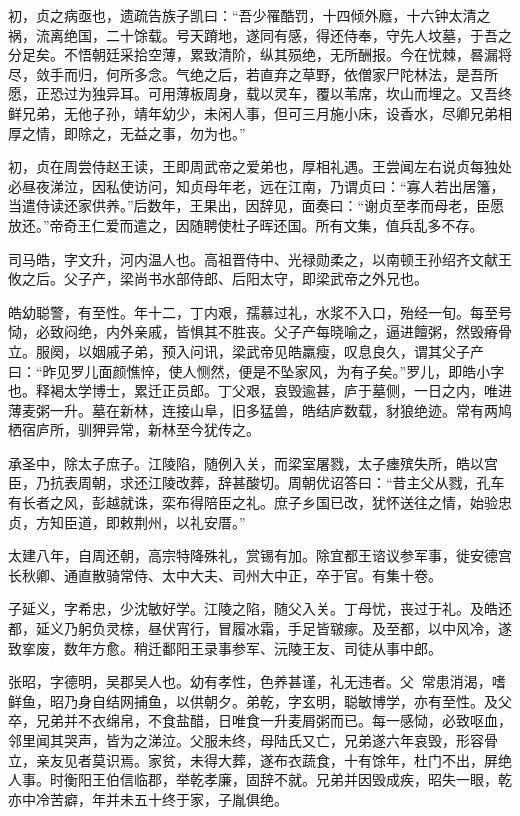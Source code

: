 \documentclass[]{article}
\begin{document}
初，贞之病亟也，遗疏告族子凯曰：``吾少罹酷罚，十四倾外廕，十六钟太清之祸，流离绝国，二十馀载。号天蹐地，遂同有感，得还侍奉，守先人坟墓，于吾之分足矣。不悟朝廷采拾空薄，累致清阶，纵其殒绝，无所酬报。今在忧棘，晷漏将尽，敛手而归，何所多念。气绝之后，若直弃之草野，依僧家尸陀林法，是吾所愿，正恐过为独异耳。可用薄板周身，载以灵车，覆以苇席，坎山而埋之。又吾终鲜兄弟，无他子孙，靖年幼少，未闲人事，但可三月施小床，设香水，尽卿兄弟相厚之情，即除之，无益之事，勿为也。''

初，贞在周尝侍赵王读，王即周武帝之爱弟也，厚相礼遇。王尝闻左右说贞每独处必昼夜涕泣，因私使访问，知贞母年老，远在江南，乃谓贞曰：``寡人若出居籓，当遣侍读还家供养。''后数年，王果出，因辞见，面奏曰：``谢贞至孝而母老，臣愿放还。''帝奇王仁爱而遣之，因随聘使杜子晖还国。所有文集，值兵乱多不存。

司马皓，字文升，河内温人也。高祖晋侍中、光禄勋柔之，以南顿王孙绍齐文献王攸之后。父子产，梁尚书水部侍郎、后阳太守，即梁武帝之外兄也。

皓幼聪警，有至性。年十二，丁内艰，孺慕过礼，水浆不入口，殆经一旬。每至号恸，必致闷绝，内外亲戚，皆惧其不胜丧。父子产每晓喻之，逼进饘粥，然毁瘠骨立。服阕，以姻戚子弟，预入问讯，梁武帝见皓羸瘦，叹息良久，谓其父子产曰：``昨见罗儿面颜憔悴，使人恻然，便是不坠家风，为有子矣。''罗儿，即皓小字也。释褐太学博士，累迁正员郎。丁父艰，哀毁逾甚，庐于墓侧，一日之内，唯进薄麦粥一升。墓在新林，连接山阜，旧多猛兽，皓结庐数载，豺狼绝迹。常有两鸠栖宿庐所，驯狎异常，新林至今犹传之。

承圣中，除太子庶子。江陵陷，随例入关，而梁室屠戮，太子瘗殡失所，皓以宫臣，乃抗表周朝，求还江陵改葬，辞甚酸切。周朝优诏答曰：``昔主父从戮，孔车有长者之风，彭越就诛，栾布得陪臣之礼。庶子乡国已改，犹怀送往之情，始验忠贞，方知臣道，即敕荆州，以礼安厝。''

太建八年，自周还朝，高宗特降殊礼，赏锡有加。除宜都王谘议参军事，徙安德宫长秋卿、通直散骑常侍、太中大夫、司州大中正，卒于官。有集十卷。

子延义，字希忠，少沈敏好学。江陵之陷，随父入关。丁母忧，丧过于礼。及皓还都，延义乃躬负灵榇，昼伏宵行，冒履冰霜，手足皆皲瘃。及至都，以中风冷，遂致挛废，数年方愈。稍迁鄱阳王录事参军、沅陵王友、司徒从事中郎。

张昭，字德明，吴郡吴人也。幼有孝性，色养甚谨，礼无违者。父，常患消渴，嗜鲜鱼，昭乃身自结网捕鱼，以供朝夕。弟乾，字玄明，聪敏博学，亦有至性。及父卒，兄弟并不衣绵帛，不食盐醋，日唯食一升麦屑粥而已。每一感恸，必致呕血，邻里闻其哭声，皆为之涕泣。父服未终，母陆氏又亡，兄弟遂六年哀毁，形容骨立，亲友见者莫识焉。家贫，未得大葬，遂布衣蔬食，十有馀年，杜门不出，屏绝人事。时衡阳王伯信临郡，举乾孝廉，固辞不就。兄弟并因毁成疾，昭失一眼，乾亦中冷苦癖，年并未五十终于家，子胤俱绝。
\end{document}
